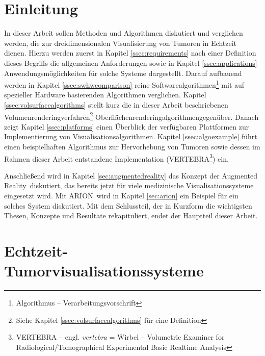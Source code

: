 \documentclass[ngerman,pdftex,paper=A4,DIV=calc,titlepage,12pt]{scrartcl}
\newtheorem[L]{boxedDefinition}{Definition}
\newcommand{\footnoteremember}[2]{\footnote{#2}\newcounter{#1}\setcounter{#1}{\value{footnote}}}
\newcommand{\footnoterecall}[1]{\footnotemark[\value{#1}]}
\begin{document}
\section{Einleitung}\label{sec:introduction}
In dieser Arbeit sollen Methoden und Algorithmen diskutiert und verglichen werden, die zur dreidimensionalen Visualisierung von Tumoren in Echtzeit dienen. Hierzu werden zuerst in Kapitel \vref{ssec:requirements} nach einer Definition dieses Begriffs die allgemeinen Anforderungen sowie in Kapitel \vref{ssec:applications} Anwendungsmöglichkeiten für solche Systeme dargestellt. Darauf aufbauend werden in Kapitel \vref{ssec:swhwcomparison} reine Softwarealgorithmen\footnote{Algorithmus -- Verarbeitungsvorschrift} mit auf spezieller Hardware basierenden Algorithmen verglichen. Kapitel \vref{ssec:volsurfacealgorithms} stellt kurz die in dieser Arbeit beschriebenen Volumenrenderingverfahren\footnoteremember{renderexp}{Siehe Kapitel \ref{ssec:volsurfacealgorithms} für eine Definition} Oberflächenrenderingalgorithmen\footnoterecall{renderexp} gegenüber. Danach zeigt Kapitel \vref{ssec:platforms} einen Überblick der verfügbaren Plattformen zur Implementierung von Visualisationsalgorithmen. Kapitel \vref{ssec:algoexample} führt einen beispielhaften Algorithmus zur Hervorhebung von Tumoren sowie dessen im Rahmen dieser Arbeit entstandene Implementation (\glqq VERTEBRA\footnote{VERTEBRA -- engl. \textit{vertebra} = Wirbel -- Volumetric Examiner for Radiological/Tomographical Experimental Basic Realtime Analysis}\grqq) ein.

Anschließend wird in Kapitel \vref{sec:augmentedreality} das Konzept der \glqq Augmented Reality\grqq\ diskutiert, das bereits jetzt für viele medizinische Visualisationssysteme eingesetzt wird. Mit ARION\texttrademark\  wird in Kapitel \vref{sec:arion} ein Beispiel für ein solches System diskutiert.
Mit dem Schlussteil, der in Kurzform die wichtigsten Thesen, Konzepte und Resultate rekapituliert, endet der Hauptteil dieser Arbeit.
\section{Echtzeit-Tumorvisualisationssysteme}\label{sec:vissystems}
\end{document}

